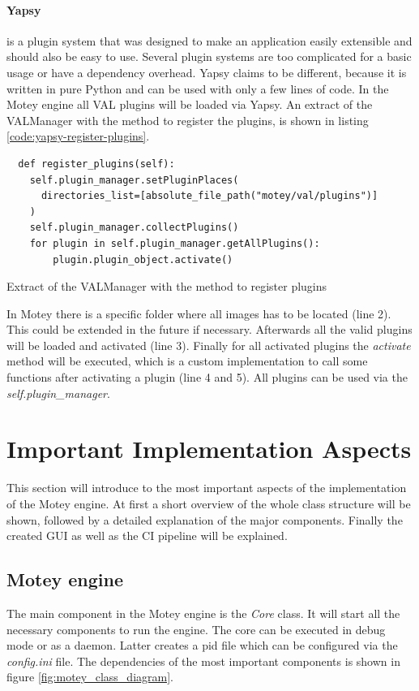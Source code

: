 \paragraph{Yapsy} is a plugin system that was designed to make an application easily extensible and should also be easy to use.
Several plugin systems are too complicated for a basic usage or have a dependency overhead.
Yapsy claims to be different, because it is written in pure Python and can be used with only a few lines of code.
In the Motey engine all \ac{VAL} plugins will be loaded via Yapsy.
An extract of the VALManager with the method to register the plugins, is shown in listing \ref{code:yapsy-register-plugins}.
\begin{listing}[H]
  \begin{verbatim}
  def register_plugins(self):
    self.plugin_manager.setPluginPlaces(
      directories_list=[absolute_file_path("motey/val/plugins")]
    )
    self.plugin_manager.collectPlugins()
    for plugin in self.plugin_manager.getAllPlugins():
        plugin.plugin_object.activate()
  \end{verbatim}
  \caption{Extract of the VALManager with the method to register plugins}
  \label{code:yapsy-register-plugins}
\end{listing}
In Motey there is a specific folder where all images has to be located (line 2).
This could be extended in the future if necessary.
Afterwards all the valid plugins will be loaded and activated (line 3).
Finally for all activated plugins the \textit{activate} method will be executed, which is a custom implementation to call some functions after activating a plugin (line 4 and 5).
All plugins can be used via the \textit{self.plugin\_manager}.

\section{Important Implementation Aspects}
This section will introduce to the most important aspects of the implementation of the Motey engine.
At first a short overview of the whole class structure will be shown, followed by a detailed explanation of the major components.
Finally the created \ac{GUI} as well as the \ac{CI} pipeline will be explained.


\subsection{Motey engine}
The main component in the Motey engine is the \textit{Core} class.
It will start all the necessary components to run the engine.
The core can be executed in debug mode or as a daemon.
Latter creates a pid file which can be configured via the \textit{config.ini} file.
The dependencies of the most important components is shown in figure \ref{fig:motey_class_diagram}.

